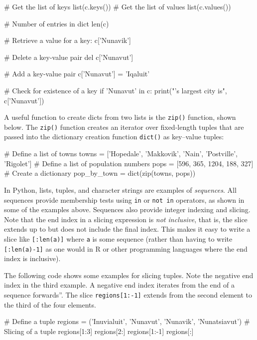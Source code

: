 \begin{pythoncode}
# Get the list of keys
list(c.keys())
# Get the list of values
list(c.values())

# Number of entries in dict
len(c)

# Retrieve a value for a key:
c['Nunavik']

# Delete a key-value pair
del c['Nunavut']

# Add a key-value pair
c['Nunavut'] = 'Iqaluit'

# Check for existence of a key
if 'Nunavut' in c:
    print("\nNunavut's largest city is", c['Nunavut'])
\end{pythoncode}

A useful function to create dicts from two lists is the \texttt{zip()} function, shown below. The \texttt{zip()} function creates an iterator over fixed-length tuples that are passed into the dictionary creation function \texttt{dict()} as key--value tuples:

\begin{pythoncode}
# Define a list of towns
towns = ['Hopedale', 'Makkovik', 'Nain', 'Postville', 'Rigolet']
# Define a list of population numbers
pops = [596, 365, 1204, 188, 327]
# Create a dictionary
pop_by_town = dict(zip(towns, pops))
\end{pythoncode}

In Python, lists, tuples, and character strings are examples of \emph{sequences}. All sequences provide membership tests using \texttt{in} or \texttt{not in} operators, as shown in some of the examples above. Sequences also provide integer indexing and slicing.  Note that the end index in a slicing expression is \emph{not inclusive}, that is, the slice extends up to but does not include the final index. This makes it easy to write a slice like \texttt{[:len(a)]} where \texttt{a} is some sequence (rather than having to write \texttt{[:len(a)-1]} as one would in R or other programming languages where the end index is inclusive).

The following code shows some examples for slicing tuples. Note the negative end index in the third example. A negative end index iterates from the end of a sequence forwards''. The slice \texttt{regions[1:-1]} extends from the second element to the third of the four elements. 

\begin{pythoncode}
# Define a tuple
regions = ('Inuvialuit', 'Nunavut', 'Nunavik', 'Nunatsiavut')
# Slicing of a tuple
regions[1:3]
regions[2:]
regions[1:-1]
regions[:]
\end{pythoncode}

